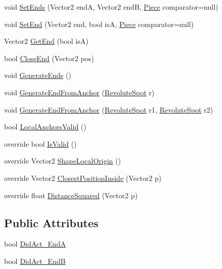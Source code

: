 \begin{DoxyCompactItemize}
\item 
void \hyperlink{classgearit_1_1src_1_1robot_1_1_rod_a409211d61fd237be234a7420f02079d0}{Set\+Ends} (Vector2 end\+A, Vector2 end\+B, \hyperlink{classgearit_1_1src_1_1robot_1_1_piece}{Piece} comparator=null)
\item 
void \hyperlink{classgearit_1_1src_1_1robot_1_1_rod_a7931a737fedf8f454aca2d1451afd704}{Set\+End} (Vector2 end, bool is\+A, \hyperlink{classgearit_1_1src_1_1robot_1_1_piece}{Piece} comparator=null)
\item 
Vector2 \hyperlink{classgearit_1_1src_1_1robot_1_1_rod_a02fddfcc9ffb37adb6301cce36f8b011}{Get\+End} (bool is\+A)
\item 
bool \hyperlink{classgearit_1_1src_1_1robot_1_1_rod_a6dc674fc54f4ee65fcb3a1c557704fa6}{Close\+End} (Vector2 pos)
\item 
void \hyperlink{classgearit_1_1src_1_1robot_1_1_rod_a405e3a4786b8b80649c6ffa22e3d260c}{Generate\+Ends} ()
\item 
void \hyperlink{classgearit_1_1src_1_1robot_1_1_rod_a1174328824276be5870906c3336bb90d}{Generate\+End\+From\+Anchor} (\hyperlink{classgearit_1_1src_1_1robot_1_1_revolute_spot}{Revolute\+Spot} r)
\item 
void \hyperlink{classgearit_1_1src_1_1robot_1_1_rod_aae0e226c9df9b791c4a07c75482e5551}{Generate\+End\+From\+Anchor} (\hyperlink{classgearit_1_1src_1_1robot_1_1_revolute_spot}{Revolute\+Spot} r1, \hyperlink{classgearit_1_1src_1_1robot_1_1_revolute_spot}{Revolute\+Spot} r2)
\item 
bool \hyperlink{classgearit_1_1src_1_1robot_1_1_rod_aa378c9c716e54ffee86dfa97b4486fba}{Local\+Anchors\+Valid} ()
\item 
override bool \hyperlink{classgearit_1_1src_1_1robot_1_1_rod_ae7aa0ceae5dad57dfb532933d4b1b88d}{Is\+Valid} ()
\item 
override Vector2 \hyperlink{classgearit_1_1src_1_1robot_1_1_rod_a306f2cbfd5a5510f55a17c4b8f07b2ee}{Shape\+Local\+Origin} ()
\item 
override Vector2 \hyperlink{classgearit_1_1src_1_1robot_1_1_rod_ab2b2e91a17d9c39fa36e58667527598b}{Closest\+Position\+Inside} (Vector2 p)
\item 
override float \hyperlink{classgearit_1_1src_1_1robot_1_1_rod_a7103977ea32f5d3f378f46626f885459}{Distance\+Squared} (Vector2 p)
\end{DoxyCompactItemize}
\subsection*{Public Attributes}
\begin{DoxyCompactItemize}
\item 
bool \hyperlink{classgearit_1_1src_1_1robot_1_1_rod_a2589a36457c0b89aad861f8653bd7c75}{Did\+Act\+\_\+\+End\+A}
\item 
bool \hyperlink{classgearit_1_1src_1_1robot_1_1_rod_a6e2c74453ed46d4253e5e33531616ee4}{Did\+Act\+\_\+\+End\+B}
\end{DoxyCompactItemize}
